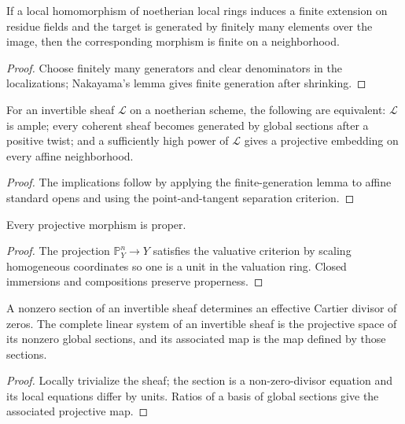 \begin{lemma}
\label{lem:II-7-4}
If a local homomorphism of noetherian local rings induces a finite extension on residue fields and
the target is generated by finitely many elements over the image, then the corresponding morphism is
finite on a neighborhood.
\end{lemma}
\begin{proof}
Choose finitely many generators and clear denominators in the localizations; Nakayama's lemma gives
finite generation after shrinking.
\end{proof}

\begin{proposition}
\label{prop:II-7-5}
For an invertible sheaf $\mathcal L$ on a noetherian scheme, the following are equivalent: $\mathcal L$
is ample; every coherent sheaf becomes generated by global sections after a positive twist; and a
sufficiently high power of $\mathcal L$ gives a projective embedding on every affine neighborhood.
\end{proposition}
\begin{proof}
The implications follow by applying the finite-generation lemma to affine standard opens and using
the point-and-tangent separation criterion.
\end{proof}

\begin{theorem}
\label{thm:II-7-6}
Every projective morphism is proper.
\end{theorem}
\begin{proof}
The projection $\mathbb P^n_Y\to Y$ satisfies the valuative criterion by scaling homogeneous coordinates
so one is a unit in the valuation ring. Closed immersions and compositions preserve properness.
\end{proof}

\begin{proposition}
\label{prop:II-7-7}
A nonzero section of an invertible sheaf determines an effective Cartier divisor of zeros. The
complete linear system of an invertible sheaf is the projective space of its nonzero global sections,
and its associated map is the map defined by those sections.
\end{proposition}
\begin{proof}
Locally trivialize the sheaf; the section is a non-zero-divisor equation and its local equations differ
by units. Ratios of a basis of global sections give the associated projective map.
\end{proof}


